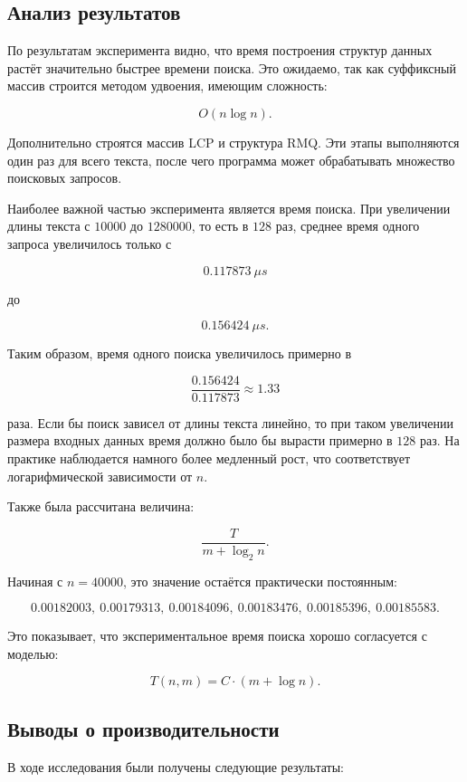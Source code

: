 \subsection{Анализ результатов}

По результатам эксперимента видно, что время построения структур данных растёт значительно быстрее времени поиска. 
Это ожидаемо, так как суффиксный массив строится методом удвоения, имеющим сложность:

\[
O(n \log n).
\]

Дополнительно строятся массив LCP и структура RMQ. 
Эти этапы выполняются один раз для всего текста, после чего программа может обрабатывать множество поисковых запросов.

Наиболее важной частью эксперимента является время поиска. 
При увеличении длины текста с \(10000\) до \(1280000\), то есть в \(128\) раз, среднее время одного запроса увеличилось только с

\[
0.117873\ \mu s
\]

до

\[
0.156424\ \mu s.
\]

Таким образом, время одного поиска увеличилось примерно в

\[
\frac{0.156424}{0.117873} \approx 1.33
\]

раза. Если бы поиск зависел от длины текста линейно, то при таком увеличении размера входных данных время должно было бы вырасти примерно в \(128\) раз. 
На практике наблюдается намного более медленный рост, что соответствует логарифмической зависимости от \(n\).

Также была рассчитана величина:

\[
\frac{T}{m + \log_2 n}.
\]

Начиная с \(n = 40000\), это значение остаётся практически постоянным:

\[
0.00182003,\ 0.00179313,\ 0.00184096,\ 0.00183476,\ 0.00185396,\ 0.00185583.
\]

Это показывает, что экспериментальное время поиска хорошо согласуется с моделью:

\[
T(n, m) = C \cdot (m + \log n).
\]

\subsection{Выводы о производительности}

В ходе исследования были получены следующие результаты:

